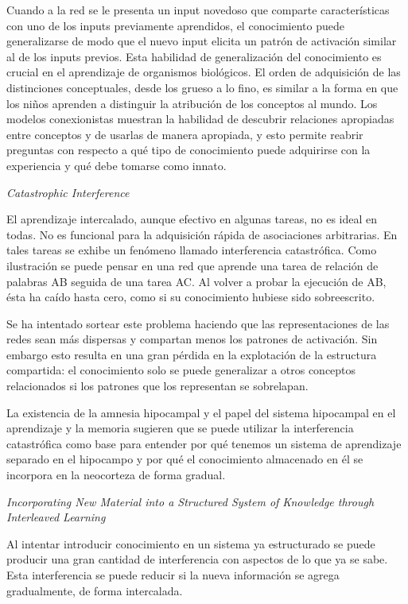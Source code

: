 \documentclass[a4paper,12pt]{article}
\begin{document}
Cuando a la red se le presenta un input novedoso que comparte características con uno de los inputs previamente aprendidos, el conocimiento puede generalizarse de modo que el nuevo input elicita un patrón de activación similar al de los inputs previos. Esta habilidad de generalización del conocimiento es crucial en el aprendizaje de organismos biológicos. El orden de adquisición de las distinciones conceptuales, desde los grueso a lo fino, es similar a la forma en que los niños aprenden a distinguir la atribución de los conceptos al mundo. Los modelos conexionistas muestran la habilidad de descubrir relaciones apropiadas entre conceptos y de usarlas de manera apropiada, y esto permite reabrir preguntas con respecto a qué tipo de conocimiento puede adquirirse con la experiencia y qué debe tomarse como innato.

{\itshape Catastrophic Interference}

El aprendizaje intercalado, aunque efectivo en algunas tareas, no es ideal en todas. No es funcional para la adquisición rápida de asociaciones arbitrarias. En tales tareas se exhibe un fenómeno llamado interferencia catastrófica. Como ilustración se puede pensar en una red que aprende una tarea de relación de palabras AB seguida de una tarea AC. Al volver a probar la ejecución de AB, ésta ha caído hasta cero, como si su conocimiento hubiese sido sobreescrito.

Se ha intentado sortear este problema haciendo que las representaciones de las redes sean más dispersas y compartan menos los patrones de activación. Sin embargo esto resulta en una gran pérdida en la explotación de la estructura compartida: el conocimiento solo se puede generalizar a otros conceptos relacionados si los patrones que los representan se sobrelapan. 

La existencia de la amnesia hipocampal y el papel del sistema hipocampal en el aprendizaje y la memoria sugieren que se puede utilizar la interferencia catastrófica como base para entender por qué tenemos un sistema de aprendizaje separado en el hipocampo y por qué el conocimiento almacenado en él se incorpora en la neocorteza de forma gradual.

{\itshape Incorporating New Material into a Structured System of Knowledge through Interleaved Learning}

Al intentar introducir conocimiento en un sistema ya estructurado se puede producir una gran cantidad de interferencia con aspectos de lo que ya se sabe. Esta interferencia se puede reducir si la nueva información se agrega gradualmente, de forma intercalada.
\end{document}
